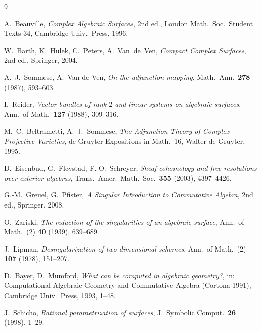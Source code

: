 \documentclass{amsart}
\theoremstyle{plain}
\theoremstyle{definition}
\begin{document}
\begin{thebibliography}{9}

 A.~Beauville, \emph{Complex Algebraic Surfaces},
2nd ed., London Math.\ Soc.\ Student Texts 34, Cambridge Univ.\ Press, 1996.

 W.~Barth, K.~Hulek, C.~Peters, A.~Van~de~Ven,
\emph{Compact Complex Surfaces}, 2nd ed., Springer, 2004.

 A.~J.~Sommese, A.~Van de Ven, \emph{On the adjunction mapping},
Math.\ Ann.\ \textbf{278} (1987), 593--603.

 I.~Reider, \emph{Vector bundles of rank $2$ and linear systems
on algebraic surfaces}, Ann.\ of Math.\ \textbf{127} (1988), 309--316.

 M.~C.~Beltrametti, A.~J.~Sommese,
\emph{The Adjunction Theory of Complex Projective Varieties},
de Gruyter Expositions in Math.\ 16, Walter de Gruyter, 1995.

 D.~Eisenbud, G.~Fl\o ystad, F.-O.~Schreyer,
\emph{Sheaf cohomology and free resolutions over exterior algebras},
Trans.\ Amer.\ Math.\ Soc.\ \textbf{355} (2003), 4397--4426.

 G.-M.~Greuel, G.~Pfister,
\emph{A Singular Introduction to Commutative Algebra},
2nd ed., Springer, 2008.

 O.~Zariski, \emph{The reduction of the singularities of an
algebraic surface}, Ann.\ of Math.\ (2) \textbf{40} (1939), 639--689.

 J.~Lipman, \emph{Desingularization of two-dimensional
schemes}, Ann.\ of Math.\ (2) \textbf{107} (1978), 151--207.

 D.~Bayer, D.~Mumford, \emph{What can be computed in algebraic
geometry?}, in: Computational Algebraic Geometry and Commutative Algebra
(Cortona 1991), Cambridge Univ.\ Press, 1993, 1--48.

 J.~Schicho, \emph{Rational parametrization of surfaces},
J.\ Symbolic Comput.\ \textbf{26} (1998), 1--29.

\end{thebibliography}
\end{document}
